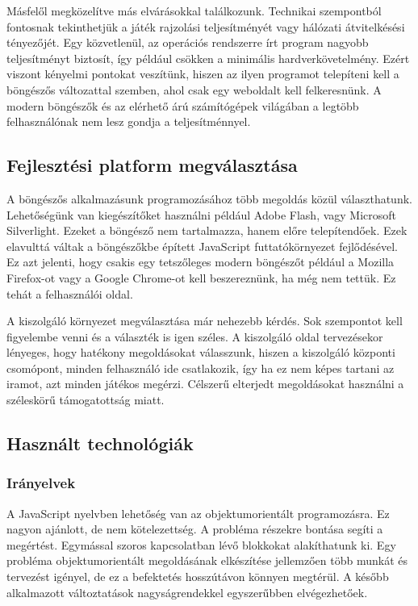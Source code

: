 \documentclass[]{article}
\begin{document}
Másfelől megközelítve más elvárásokkal találkozunk. Technikai
szempontból fontosnak tekinthetjük a játék rajzolási teljesítményét vagy
hálózati átvitelkésési tényezőjét. Egy közvetlenül, az operációs
rendszerre írt program nagyobb teljesítményt biztosít, így például
csökken a minimális hardverkövetelmény. Ezért viszont kényelmi pontokat
veszítünk, hiszen az ilyen programot telepíteni kell a böngészős
változattal szemben, ahol csak egy weboldalt kell felkeresnünk. A modern
böngészők és az elérhető árú számítógépek világában a legtöbb
felhasználónak nem lesz gondja a teljesítménnyel.


\subsection{Fejlesztési platform
megválasztása}

A böngészős alkalmazásunk programozásához több megoldás közül
választhatunk. Lehetőségünk van kiegészítőket használni például Adobe
Flash, vagy Microsoft Silverlight. Ezeket a böngésző nem tartalmazza,
hanem előre telepítendőek. Ezek elavulttá váltak a böngészőkbe épített
JavaScript futtatókörnyezet fejlődésével. Ez azt jelenti, hogy csakis
egy tetszőleges modern böngészőt például a Mozilla Firefox-ot vagy a
Google Chrome-ot kell beszereznünk, ha még nem tettük. Ez tehát a
felhasználói oldal.

A kiszolgáló környezet megválasztása már nehezebb kérdés. Sok szempontot
kell figyelembe venni és a választék is igen széles. A kiszolgáló oldal
tervezésekor lényeges, hogy hatékony megoldásokat válasszunk, hiszen a
kiszolgáló központi csomópont, minden felhasználó ide csatlakozik, így
ha ez nem képes tartani az iramot, azt minden játékos megérzi. Célszerű
elterjedt megoldásokat használni a széleskörű támogatottság miatt.


\subsection{Használt
technológiák}


\subsubsection{Irányelvek}

A JavaScript nyelvben lehetőség van az objektumorientált programozásra.
Ez nagyon ajánlott, de nem kötelezettség. A probléma részekre bontása
segíti a megértést. Egymással szoros kapcsolatban lévő blokkokat
alakíthatunk ki. Egy probléma objektumorientált megoldásának elkészítése
jellemzően több munkát és tervezést igényel, de ez a befektetés
hosszútávon könnyen megtérül. A később alkalmazott változtatások
nagyságrendekkel egyszerűbben elvégezhetőek.
\end{document}
